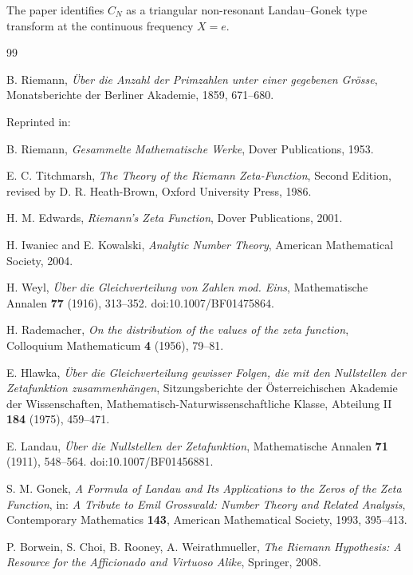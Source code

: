 \documentclass[11pt]{amsart}
\numberwithin{equation}{section}
\theoremstyle{plain}
\theoremstyle{definition}
\theoremstyle{remark}
\begin{document}
The paper identifies \(C_N\) as a triangular non-resonant Landau--Gonek
type transform at the continuous frequency \(X=e\).

\begin{thebibliography}{99}

B. Riemann,
\emph{\"Uber die Anzahl der Primzahlen unter einer gegebenen Gr\"osse},
Monatsberichte der Berliner Akademie,
1859,
671--680.

Reprinted in:

B. Riemann,
\emph{Gesammelte Mathematische Werke},
Dover Publications,
1953.

E. C. Titchmarsh,
\emph{The Theory of the Riemann Zeta-Function},
Second Edition,
revised by D. R. Heath-Brown,
Oxford University Press,
1986.

H. M. Edwards,
\emph{Riemann's Zeta Function},
Dover Publications,
2001.

H. Iwaniec and E. Kowalski,
\emph{Analytic Number Theory},
American Mathematical Society,
2004.

H. Weyl,
\emph{\"Uber die Gleichverteilung von Zahlen mod. Eins},
Mathematische Annalen
\textbf{77} (1916),
313--352.
doi:10.1007/BF01475864.

H. Rademacher,
\emph{On the distribution of the values of the zeta function},
Colloquium Mathematicum
\textbf{4} (1956),
79--81.

E. Hlawka,
\emph{\"Uber die Gleichverteilung gewisser Folgen,
die mit den Nullstellen der Zetafunktion zusammenh\"angen},
Sitzungsberichte der
\"Osterreichischen Akademie der Wissenschaften,
Mathematisch-Naturwissenschaftliche Klasse,
Abteilung II
\textbf{184} (1975),
459--471.

E. Landau,
\emph{\"Uber die Nullstellen der Zetafunktion},
Mathematische Annalen
\textbf{71} (1911),
548--564.
doi:10.1007/BF01456881.

S. M. Gonek,
\emph{A Formula of Landau and Its Applications to the Zeros of the Zeta Function},
in:
\emph{A Tribute to Emil Grosswald:
Number Theory and Related Analysis},
Contemporary Mathematics
\textbf{143},
American Mathematical Society,
1993,
395--413.

P. Borwein,
S. Choi,
B. Rooney,
A. Weirathmueller,
\emph{The Riemann Hypothesis:
A Resource for the Afficionado and Virtuoso Alike},
Springer,
2008.


\end{thebibliography}
\end{document}

